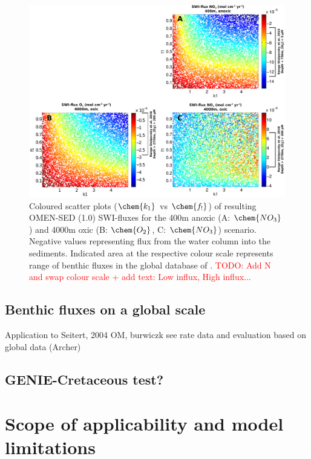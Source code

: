 \documentclass[gmd, manuscript]{copernicus}
\begin{document}
\begin{figure}[htbp]
\begin{center}
	\includegraphics[width=1.0\textwidth]{figures/SA/k1_vs_f1_SWIflux_COMBINED.pdf}
	\caption{Coloured scatter plots ($\chem{k_1}$ vs $\chem{f_!}$) of resulting OMEN-SED (1.0) SWI-fluxes for the 400m anoxic (A: $\chem{NO_3}$) and 4000m oxic (B: $\chem{O_2}$, C: $\chem{NO_3}$) scenario. 
	Negative values representing flux from the water column into the sediments.
	Indicated area at the respective colour scale represents range of benthic fluxes in the global database of \citet{bohlen_simple_2012}. 
	\textcolor{red}{TODO: Add N and swap colour scale + add text: Low influx, High influx...}}
	\label{fig:SA_Color_ScatterPlots}
\end{center}
\end{figure}




\subsection{Benthic fluxes on a global scale}
Application to Seitert, 2004 OM, burwiczk see rate data and evaluation based on global data (Archer)

\subsection{GENIE-Cretaceous test?}

\section{Scope of applicability and model limitations}
\end{document}
